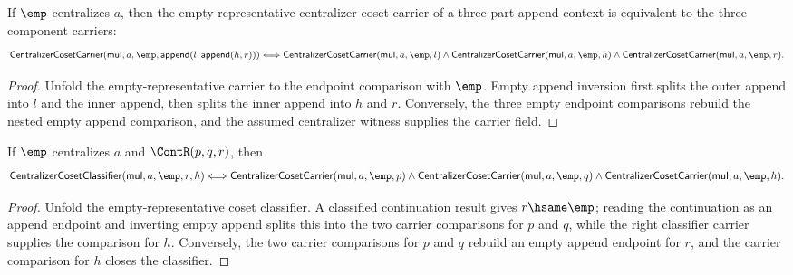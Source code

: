 \begin{theorem}
\label{thm:quotientgroup-centralizer-coset-empty-representative-context}
If $\emp$ centralizes $a$, then the empty-representative centralizer-coset
carrier of a three-part append context is equivalent to the three component
carriers:
$$
\mathsf{CentralizerCosetCarrier}(\mathsf{mul},a,\emp,
  \mathsf{append}(l,\mathsf{append}(h,r)))
\Longleftrightarrow
\mathsf{CentralizerCosetCarrier}(\mathsf{mul},a,\emp,l)\wedge
\mathsf{CentralizerCosetCarrier}(\mathsf{mul},a,\emp,h)\wedge
\mathsf{CentralizerCosetCarrier}(\mathsf{mul},a,\emp,r).
$$
\end{theorem}
\begin{proof}
Unfold the empty-representative carrier to the endpoint comparison with
$\emp$. Empty append inversion first splits the outer append into $l$ and the
inner append, then splits the inner append into $h$ and $r$. Conversely, the
three empty endpoint comparisons rebuild the nested empty append comparison,
and the assumed centralizer witness supplies the carrier field.
\end{proof}

\begin{theorem}
\label{thm:quotientgroup-centralizer-coset-empty-continuation-classifier}
If $\emp$ centralizes $a$ and $\ContR(p,q,r)$, then
$$
\mathsf{CentralizerCosetClassifier}(\mathsf{mul},a,\emp,r,h)
\Longleftrightarrow
\mathsf{CentralizerCosetCarrier}(\mathsf{mul},a,\emp,p)
\wedge
\mathsf{CentralizerCosetCarrier}(\mathsf{mul},a,\emp,q)
\wedge
\mathsf{CentralizerCosetCarrier}(\mathsf{mul},a,\emp,h).
$$
\end{theorem}
\begin{proof}
Unfold the empty-representative coset classifier. A classified continuation
result gives $r\hsame\emp$; reading the continuation as an append endpoint and
inverting empty append splits this into the two carrier comparisons for $p$
and $q$, while the right classifier carrier supplies the comparison for $h$.
Conversely, the two carrier comparisons for $p$ and $q$ rebuild an empty
append endpoint for $r$, and the carrier comparison for $h$ closes the
classifier.
\end{proof}

